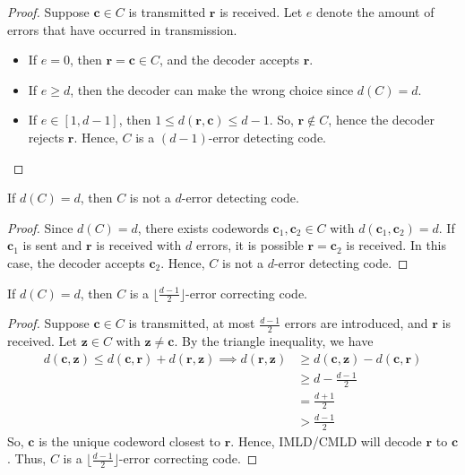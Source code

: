 \begin{proof}
    Suppose $ \bm{c}\in C $ is transmitted $ \bm{r} $ is received. Let
    $ e $ denote the amount of errors that have occurred in transmission.
    \begin{itemize}
        \item If $ e = 0 $, then $ \bm{r}=\bm{c}\in C $, and the decoder accepts
        $ \bm{r} $.
        \item If $ e \geq d $, then the decoder can make the wrong
        choice since $ d(C)=d $.
        \item If $ e\in[1,d-1] $, then
        $ 1\leqslant d(\bm{r},\bm{c})\leqslant d-1 $.
        So, $ \bm{r}\notin C $, hence the decoder
        rejects $ \bm{r} $. Hence, $ C $ is a $ (d-1) $-error detecting code.
    \end{itemize}
\end{proof}

\begin{thmbox}
    \begin{theorem}
    If $ d(C)=d $, then $ C $ is not a $ d $-error detecting code.
\end{theorem} \end{thmbox}

\begin{proof}
    Since $ d(C)=d $, there exists codewords $ \bm{c}_1,\bm{c}_2\in C $
    with $ d(\bm{c}_1,\bm{c}_2)=d $. If $ \bm{c}_1 $ is sent and $ \bm{r} $
    is received with $ d $ errors, it is possible $ \bm{r}=\bm{c}_2 $
    is received. In this case, the decoder accepts $ \bm{c}_2 $.
    Hence, $ C $ is not a $ d $-error detecting code.
\end{proof}

\begin{thmbox}
    \begin{theorem}
    If $ d(C)=d $, then $ C $ is a $ \lfloor \frac{d-1}{2} \rfloor $-error
    correcting code.
\end{theorem} \end{thmbox}

\begin{proof}
    Suppose $ \bm{c}\in C $ is transmitted, at most $ \frac{d-1}{2}  $ errors
    are introduced, and $ \bm{r} $ is received. 
    Let $ \bm{z}\in C $ with $ \bm{z}\neq \bm{c} $.
    By the triangle inequality, we have
    \begin{align*}
        d(\bm{c},\bm{z})\leqslant d(\bm{c},\bm{r})+d(\bm{r},\bm{z})\implies
        d(\bm{r},\bm{z})
        &\geqslant d(\bm{c},\bm{z})-d(\bm{c},\bm{r})\\
        &\geqslant d-\frac{d-1}{2}\\
        &=\frac{d+1}{2}\\
        &>\frac{d-1}{2}
    \end{align*}
    So, $ \bm{c} $ is the unique codeword closest to $ \bm{r} $. Hence, IMLD/CMLD
    will decode $ \bm{r} $ to $ \bm{c} $. Thus, $ C $ is a 
    $ \lfloor \frac{d-1}{2} \rfloor $-error correcting code.
\end{proof}

